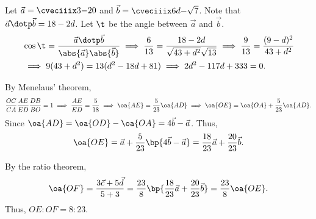 \begin{solution}
    \begin{ppart}
        Let $\vec a = \cveciiix3{-2}0$ and $\vec b = \cveciiix6d{-\sqrt7}$. Note that $\vec a \dotp \vec b = 18 - 2d$. Let $\t$ be the angle between $\vec a$ and $\vec b$.
        \begin{align*}
            &\cos \t = \frac{\vec a \dotp \vec b}{\abs{\vec a}\abs{\vec b}} \implies \frac6{13} = \frac{18-2d}{\sqrt{43 + d^2}\sqrt{13}} \implies \frac{9}{13} = \frac{(9-d)^2}{43 + d^2}\\
            &\implies 9(43 + d^2) = 13(d^2 - 18d + 81) \implies 2d^2 - 117d + 333 = 0.
        \end{align*}
    \end{ppart}
    \begin{ppart}
        \begin{psubpart}
            By Menelaus' theorem, \[\frac{OC}{CA} \frac{AE}{ED} \frac{DB}{BO} = 1 \implies \frac{AE}{ED} = \frac{5}{18} \implies \oa{AE} = \frac5{23} \oa{AD} \implies \oa{OE} = \oa{OA} + \frac5{23} \oa{AD}.\] Since $\oa{AD} = \oa{OD} - \oa{OA} = 4\vec b - \vec a$. Thus, \[\oa{OE} = \vec a + \frac5{23} \bp{4\vec b - \vec a} = \frac{18}{23} \vec a + \frac{20}{23} \vec b.\]
        \end{psubpart}
        \begin{psubpart}
            By the ratio theorem, \[\oa{OF} = \frac{3\vec c + 5\vec d}{5 + 3} = \frac{23}8 \bp{\frac{18}{23} \vec a + \frac{20}{23} \vec b} = \frac{23}8 \oa{OE}.\] Thus, $OE : OF = 8 : 23$.
        \end{psubpart}
    \end{ppart}
\end{solution}

